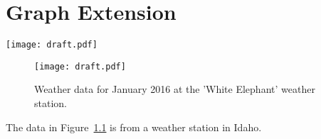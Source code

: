 
\chapter{\label{graph-extension}Graph Extension}
\par
\texttt{[image: draft.pdf]}
\begin{figure}
\caption{\label{white-elephant}Weather data for January 2016 at the 'White Elephant' weather station.}
\par
\texttt{[image: draft.pdf]}
\end{figure}

\par The data in Figure~\ref{white-elephant} is from a weather station in Idaho. 